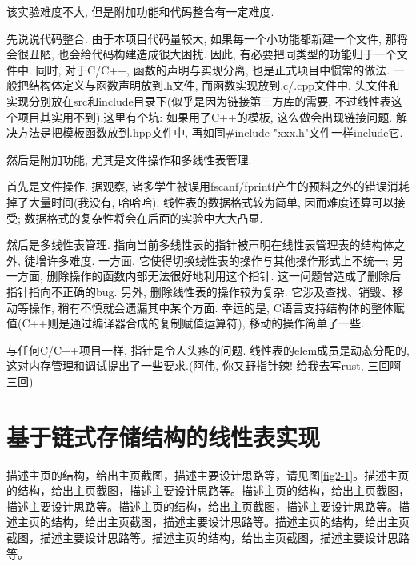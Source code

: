 \documentclass[supercite]{Experimental_Report}
\theoremstyle{definition}
\begin{document}
该实验难度不大, 但是附加功能和代码整合有一定难度.

先说说代码整合. 由于本项目代码量较大, 如果每一个小功能都新建一个文件, 那将会很丑陋, 也会给代码构建造成很大困扰. 因此, 有必要把同类型的功能归于一个文件中. 同时, 对于C/C++, 函数的声明与实现分离, 也是正式项目中惯常的做法. 一般把结构体定义与函数声明放到.h文件, 而函数实现放到.c/.cpp文件中. 头文件和实现分别放在src和include目录下(似乎是因为链接第三方库的需要, 不过线性表这个项目其实用不到).这里有个坑: 如果用了C++的模板, 这么做会出现链接问题. 解决方法是把模板函数放到.hpp文件中, 再如同\#include "xxx.h"文件一样include它.

然后是附加功能, 尤其是文件操作和多线性表管理.

首先是文件操作. 据观察, 诸多学生被误用fscanf/fprintf产生的预料之外的错误消耗掉了大量时间(我没有, 哈哈哈). 线性表的数据格式较为简单, 因而难度还算可以接受; 数据格式的复杂性将会在后面的实验中大大凸显.

然后是多线性表管理. 指向当前多线性表的指针被声明在线性表管理表的结构体之外, 徒增许多难度. 一方面, 它使得切换线性表的操作与其他操作形式上不统一; 另一方面, 删除操作的函数内部无法很好地利用这个指针. 这一问题曾造成了删除后指针指向不正确的bug. 另外, 删除线性表的操作较为复杂. 它涉及查找、销毁、移动等操作, 稍有不慎就会遗漏其中某个方面. 幸运的是, C语言支持结构体的整体赋值(C++则是通过编译器合成的复制赋值运算符\cite{CopyAssignmentCppReference}), 移动的操作简单了一些.

与任何C/C++项目一样, 指针是令人头疼的问题. 线性表的elem成员是动态分配的, 这对内存管理和调试提出了一些要求.(阿伟, 你又野指针辣! 给我去写rust, 三回啊三回)

\newpage

\section{基于链式存储结构的线性表实现}

描述主页的结构，给出主页截图，描述主要设计思路等，请见图\ref{fig2-1}。描述主页的结构，给出主页截图，描述主要设计思路等。描述主页的结构，给出主页截图，描述主要设计思路等。描述主页的结构，给出主页截图，描述主要设计思路等。描述主页的结构，给出主页截图，描述主要设计思路等。描述主页的结构，给出主页截图，描述主要设计思路等。描述主页的结构，给出主页截图，描述主要设计思路等。
\end{document}
